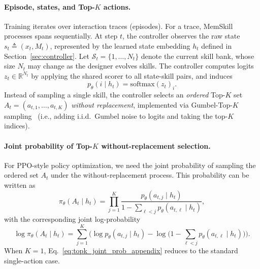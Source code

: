 \paragraph{Episode, states, and Top-$K$ actions.}
Training iterates over interaction traces (episodes). For a trace, MemSkill processes spans sequentially. 
At step $t$, the controller observes the raw state $s_t \triangleq (x_t,M_t)$, represented by the learned state embedding $h_t$ defined in Section~\ref{sec:controller}.
Let $\mathcal{S}_t=\{1,\dots,N_t\}$ denote the current skill bank, whose size $N_t$ may change as the designer evolves skills.
The controller computes logits $z_t\in\mathbb{R}^{N_t}$ by applying the shared scorer to all state-skill pairs, and induces
\begin{equation}
p_\theta(i\mid h_t)=\mathrm{softmax}(z_t)_i.
\end{equation}
Instead of sampling a single skill, the controller selects an \emph{ordered} Top-$K$ set
$A_t=(a_{t,1},\dots,a_{t,K})$ \emph{without replacement}, implemented via Gumbel-Top-$K$ sampling~\citep{kool2019stochastic} (i.e., adding i.i.d.\ Gumbel noise to logits and taking the top-$K$ indices).

\paragraph{Joint probability of Top-$K$ without-replacement selection.}
For PPO-style policy optimization, we need the joint probability of sampling the ordered set $A_t$ under the without-replacement process. This probability can be written as
\begin{equation}
\pi_\theta(A_t \mid h_t)
= \prod_{j=1}^{K}
\frac{p_\theta(a_{t,j}\mid h_t)}
{1-\sum_{\ell<j} p_\theta(a_{t,\ell}\mid h_t)} ,
\label{eq:topk_joint_prob_appendix}
\end{equation}
with the corresponding joint log-probability
\begin{equation}
\log \pi_\theta(A_t \mid h_t)
= \sum_{j=1}^{K}\Big(
\log p_\theta(a_{t,j}\mid h_t)
-\log\big(1-\sum_{\ell<j} p_\theta(a_{t,\ell}\mid h_t)\big)
\Big).
\label{eq:topk_joint_logprob_appendix}
\end{equation}
When $K=1$, Eq.~\ref{eq:topk_joint_prob_appendix} reduces to the standard single-action case.

